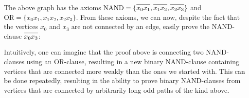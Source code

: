 \FloatBarrier
The above graph has the axioms $\text{NAND} = \{\ol{x_0x_1},\ol{x_1x_2},\ol{x_2x_3}\}$ and $\text{OR} = \{x_0x_1,x_1x_2,x_2x_3\}$.
From these axioms, we can now, despite the fact that the vertices $x_0$ and $x_3$ are not connected by an edge, easily prove the NAND-clause $\ol{x_0x_3}$:\par
\begin{figure}[!h]
  \centering
  \begin{prooftree*}
  \end{prooftree*}
\caption{}
\label{fig:proof_x0x3}
\end{figure}
Intuitively, one can imagine that the proof above is connecting two NAND-clauses using an OR-clause, resulting in a new binary NAND-clause containing vertices that are connected more weakly than the ones we started with.
This can be done repeatedly, resulting in the ability to prove binary NAND-clauses from vertices that are connected by arbitrarily long odd paths of the kind above.

